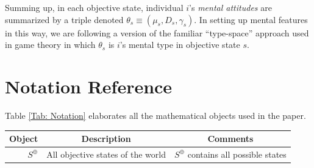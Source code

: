 \documentclass[
11pt,
titlepage,
reqno,
]{article}%
\theoremstyle{definition}
\begin{document}
Summing up, in each objective state, individual $i$'s \textit{mental attitudes} are summarized by a triple denoted $\theta_s\equiv(\mu_s,D_s,\gamma_s)$.
In setting up mental features in this way, we are following a version of the familiar ``type-space'' approach used in game theory \citep[See][]{Harsanyi1967, Mertens1985a} in which $\theta_s$ is $i$'s mental type in objective state $s$. 
	
	
	




\pagebreak
\section{Notation Reference}
Table \ref{Tab: Notation} elaborates all the mathematical objects used in the paper.
\begin{table}\centering
{}
\begin{tabular}{@{}rll@{}}\toprule
Object                                             & \multicolumn{1}{c}{Description}                       & \multicolumn{1}{c}{Comments}\\ \midrule
$S^\oplus$                                         & All objective states of the world       & $S^\oplus$ contains all possible states\\

\end{tabular}
\end{table}
\end{document}
